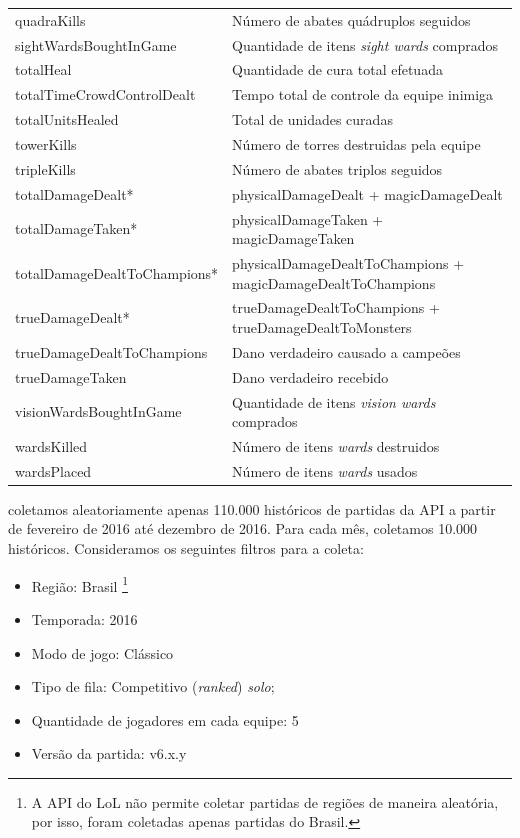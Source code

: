 \begin{table}
\begin{tabular}{p{}p{}}
quadraKills & Número de abates quádruplos seguidos\\
sightWardsBoughtInGame & Quantidade de itens \textit{sight wards} comprados\\
totalHeal & Quantidade de cura total efetuada\\
totalTimeCrowdControlDealt & Tempo total de controle da equipe inimiga\\
totalUnitsHealed & Total de unidades curadas\\
towerKills & Número de torres destruidas pela equipe\\
tripleKills & Número de abates triplos seguidos\\
totalDamageDealt* & physicalDamageDealt + magicDamageDealt \\
totalDamageTaken* & physicalDamageTaken + magicDamageTaken \\
totalDamageDealtToChampions* & physicalDamageDealtToChampions + magicDamageDealtToChampions \\
trueDamageDealt* & trueDamageDealtToChampions + trueDamageDealtToMonsters\\
trueDamageDealtToChampions & Dano verdadeiro causado a campeões\\
trueDamageTaken & Dano verdadeiro recebido\\
visionWardsBoughtInGame & Quantidade de itens \textit{vision wards} comprados\\
wardsKilled & Número de itens \textit{wards} destruidos\\
wardsPlaced & Número de itens \textit{wards} usados\\
  \bottomrule
\end{tabular}
\end{table}

 coletamos aleatoriamente apenas 110.000 históricos de partidas da API a partir de fevereiro de 2016 até dezembro de 2016. Para cada mês, coletamos 10.000 históricos. Consideramos os seguintes filtros para a coleta: 

\begin{itemize}
  \item Região: Brasil \footnote{A API do LoL não permite coletar partidas de regiões de maneira aleatória, por isso, foram coletadas apenas partidas do Brasil.}
  \item Temporada: 2016
  \item Modo de jogo: Clássico
  \item Tipo de fila: Competitivo (\textit{ranked}) \textit{solo};
  \item Quantidade de jogadores em cada equipe: 5
  \item Versão da partida: v6.x.y
\end{itemize}

